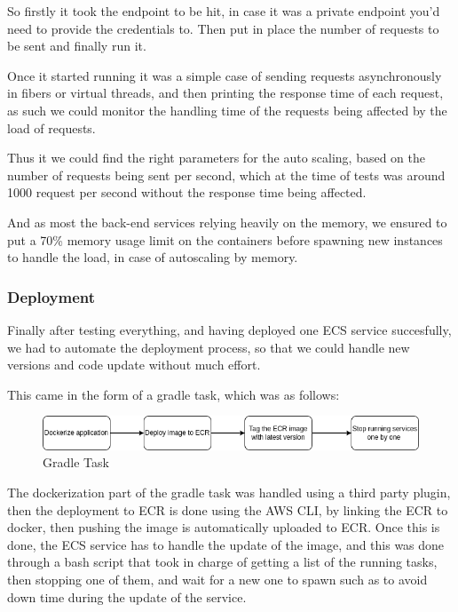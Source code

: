 So firstly it took the endpoint to be hit, in case it was a private endpoint you'd need to
provide the credentials to. Then put in place the number of requests to be sent and
finally run it.

Once it started running it was a simple case of sending requests asynchronously in fibers
or virtual threads, and then printing the response time of each request, as such we could
monitor the handling time of the requests being affected by the load of requests.

Thus it we could find the right parameters for the auto scaling, based on the number of
requests being sent per second, which at the time of tests was around 1000 request per
second without the response time being affected.

And as most the back-end services relying heavily on the memory, we ensured to put a 70\%
memory usage limit on the containers before spawning new instances to handle the load, in
case of autoscaling by memory.

\subsubsection{Deployment}

Finally after testing everything, and having deployed one ECS service succesfully, we had
to automate the deployment process, so that we could handle new versions and code update
without much effort.

This came in the form of a gradle task, which was as follows:

    \begin{figure}[!htbp]
        \centering
        \includegraphics[width=\textwidth]{images/gradle.png}
        \caption{\footnotesize{Gradle Task}}
        \label{fig:gradle}
    \end{figure}

The dockerization part of the gradle task was handled using a third party plugin,
then the deployment to ECR is done using the AWS CLI, by linking the ECR to docker,
then pushing the image is automatically uploaded to ECR.
Once this is done, the ECS service has to handle the update of the image, 
and this was done through a bash script that took in charge of getting a list 
of the running tasks, then stopping one of them, and wait for a new one to spawn 
such as to avoid down time during the update of the service.

